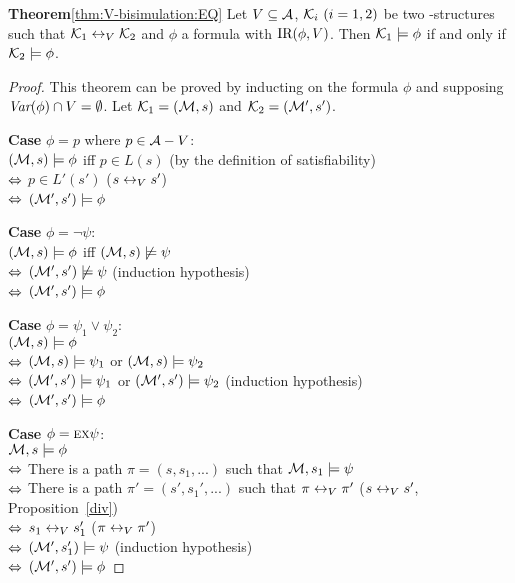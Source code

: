 \documentclass{article}
\begin{document}
 \noindent\textbf{Theorem}\ref{thm:V-bisimulation:EQ}
 Let $V\subseteq\cal A$, ${\cal K}_i~(i=1,2)$ be two \MPK-structures such that
   ${\cal K}_1\leftrightarrow_V{\cal K}_2$ and $\phi$ a formula with $\textrm{IR}(\phi,V)$. Then
   ${\cal K}_1\models\phi$ if and only if ${\cal K}_2\models\phi$.
 \begin{proof}
 This theorem can be proved by inducting on the formula $\phi$ and supposing $\textit{Var}(\phi) \cap V = \emptyset$.
 Let ${\cal K}_1 = ({\cal M}, s)$ and ${\cal K}_2 = ({\cal M}', s')$.


 \textbf{Case} $\phi = p$ where $p \in {\cal A} - V$:\\
 $({\cal M}, s) \models \phi$ iff $p\in L(s)$  \hfill  (by the definition of satisfiability) \\
 $\Leftrightarrow$ $p \in L'(s')$ \hfill ($s \leftrightarrow_V s'$)\\
 $\Leftrightarrow$ $({\cal M}', s') \models \phi$

 \textbf{Case} $\phi = \neg \psi$:\\
 $({\cal M}, s) \models \phi$ iff $({\cal M}, s) \not \models \psi$ \\
 $\Leftrightarrow$ $({\cal M}', s') \not \models \psi$  \hfill   (induction hypothesis)\\
 $\Leftrightarrow$ $({\cal M}', s') \models \phi$

 \textbf{Case} $\phi = \psi_1 \vee \psi_2$:\\
 $({\cal M}, s) \models \phi$\\
 $\Leftrightarrow$ $({\cal M}, s) \models \psi_1$ or $({\cal M}, s) \models \psi_2$\\
 $\Leftrightarrow$ $({\cal M}', s') \models \psi_1$ or $({\cal M}', s') \models \psi_2$   \hfill  (induction hypothesis)\\
 $\Leftrightarrow$ $({\cal M}', s') \models \phi$

 \textbf{Case} $\phi = \textsc{e} \textsc{x} \psi$:\\
 ${\cal M}, s \models \phi$ \\
 $\Leftrightarrow$ There is a path $\pi = (s, s_1, ...)$ such that ${\cal M}, s_1 \models \psi$\\
 $\Leftrightarrow$ There is a path $\pi' = (s', s_1', ...)$ such that $\pi \leftrightarrow_V \pi'$ \hfill   ($s \leftrightarrow_V s'$, Proposition~\ref{div})\\
 $\Leftrightarrow$ $s_1 \leftrightarrow_V s_1'$  \hfill ($\pi \leftrightarrow_V \pi'$)\\
 $\Leftrightarrow$ $({\cal M}', s_1') \models \psi$  \hfill  (induction hypothesis)\\
 $\Leftrightarrow$ $({\cal M}', s') \models \phi$


\end{proof}
\end{document}
